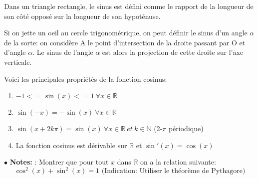 \documentclass[a4paper]{article}
\theoremstyle{break}
\newcommand{\R}{\mathbb{R}}
\newcommand{\note}{$\bullet$ \textbf{Notes: }}
\begin{document}
Dans un triangle rectangle, le sinus est défini comme le rapport de la
longueur de son côté opposé sur la longueur de son hypoténuse. 

Si on jette un oeil au cercle trigonométrique, on peut définir le sinus d'un
angle $\alpha$ de la sorte: on considère A le point d'intersection de la droite
passant par O et d'angle $\alpha$. Le sinus de l'angle $\alpha$ est alors
la projection de cette droite sur l'axe verticale.

Voici les principales propriétés de la fonction cosinus:
\begin{enumerate}[label=(\alph*), leftmargin =2cm]
\item $-1 <= \sin(x) <= 1 ~ \forall x \in \R$
\item $\sin(-x) = -\sin(x) ~ \forall x \in \R$
\item $\sin(x+2k\pi) = \sin(x) ~ \forall x \in \R ~ et ~k \in \mathbb{N}$
  (2-$\pi$ périodique)
\item La fonction cosinus est dérivable sur $\R$ et $\sin'(x) = \cos(x)$
\end{enumerate}

\note: Montrer que pour tout $x$ dans $\R$ on a la relation suivante:
\[
  \cos^2(x) + \sin^2(x) = 1 \text{ (Indication: Utiliser le théorème de Pythagore)}
\]


\end{document}

